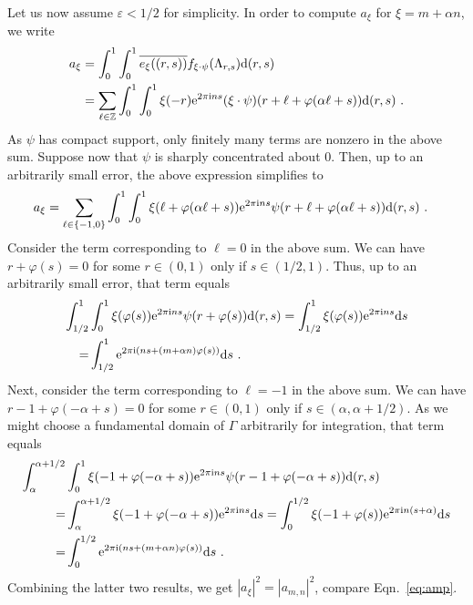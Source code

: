 \documentclass[11pt, a4wide]{amsart}
\newcommand{\euler}{\mathrm{e}}
\newcommand{\imi}{\mathrm{i}}
\newcommand{\ZZ}{\mathbb{Z}}
\numberwithin{lemma}{section}
\begin{document}
\smallskip

Let us now assume $\varepsilon<1/2$ for simplicity. In order to compute $a_\xi$ for $\xi=m+\alpha n$, we write
%
\begin{displaymath}
\begin{split}
a_\xi&=\int_0^1\int_0^1 \overline{e_\xi((r,s))} f_{\xi\cdot\psi}(\Lambda_{r,s}) {\rm d}(r,s)\\
&= \sum_{\ell\in \ZZ} \int_0^1 \int_0^1 \xi(-r)\euler^{2\pi \imi n s} (\xi\cdot\psi)(r+\ell+\varphi(\alpha\ell+s)){\rm d}(r,s) \ .
\end{split}
\end{displaymath}
%
As $\psi$ has compact support, only finitely many terms are nonzero in the above sum. Suppose now that $\psi$ is sharply concentrated about $0$. Then, up to an arbitrarily small error, the above expression simplifies to
%
\begin{displaymath}
\begin{split}
a_\xi&= \sum_{\ell\in \{-1,0\}} \int_0^1 \int_0^1 \xi(\ell+\varphi(\alpha\ell+s))\euler^{2\pi \imi n s} \psi(r+\ell+\varphi(\alpha\ell+s)){\rm d}(r,s) \ .
\end{split}
\end{displaymath}
%
Consider the term corresponding to $\ell=0$ in the above sum. We can have $r+\varphi(s)=0$ for some $r\in (0,1)$ only if $s\in (1/2,1)$. Thus, up to an arbitrarily small error, that term equals
%
\begin{displaymath}
\begin{split}
 \int_{1/2}^1 &\int_0^1 \xi(\varphi(s))\euler^{2\pi \imi n s} \psi(r+\varphi(s)){\rm d}(r,s)=
\int_{1/2}^1 \xi(\varphi(s))\euler^{2\pi \imi ns} {\rm d}s\\
=& \int_{1/2}^1 \euler^{2\pi \imi (n s+(m+\alpha n) \varphi(s))} {\rm d}s \ .
\end{split}
\end{displaymath}
%
Next, consider the term corresponding to $\ell=-1$ in the above sum. We can have $r-1+\varphi(-\alpha+s)=0$ for some $r\in (0,1)$ only if $s\in (\alpha, \alpha+1/2)$. As we might choose a fundamental domain of $\Gamma$ arbitrarily for integration, that term equals
%
\begin{displaymath}
\begin{split}
 \int_{\alpha}^{\alpha+1/2} & \int_0^1 \xi(-1+\varphi(-\alpha+s))\euler^{2\pi \imi n s} \psi(r-1+\varphi(-\alpha+s)){\rm d}(r,s)\\
=&
\int_{\alpha}^{\alpha+1/2} \xi(-1+\varphi(-\alpha+s))\euler^{2\pi \imi ns} {\rm d}s=
\int_{0}^{1/2} \xi(-1+\varphi(s))\euler^{2\pi \imi n(s+\alpha)} {\rm d}s\\
=&\int_{0}^{1/2} \euler^{2\pi \imi (n s+(m+\alpha n) \varphi(s))} {\rm d}s \ .
\end{split}
\end{displaymath}
%
Combining the latter two results, we get $|a_\xi|^2=|a_{m,n}|^2$, compare Eqn.~\eqref{eq:amp}.
\end{document}
